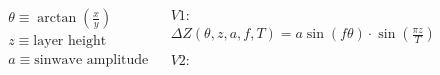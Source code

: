 \documentclass[varwidth, border={1pt 1pt 1pt 1pt}]{standalone}
\begin{document}
\(
	\begin{array}{c|c}
		\begin{matrix}
			\theta \equiv \arctan{\left( \frac{x}{y} \right)}\\
			z \equiv \text{layer height}\\
			a \equiv \text{sinwave amplitude}\\
			
		\end{matrix}
		&
		\begin{matrix}
			V1:\\
			
			\Delta Z\left(\theta,z,a,f,T\right)=
			a \sin{\left(f\theta\right)}\cdot\sin{\left(\frac{\pi z}{T}\right)}\\
			
			\\V2:\\
		\end{matrix}

	\end{array}
\)
\end{document}
